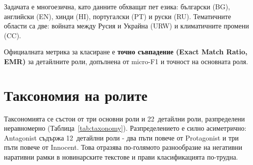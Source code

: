 \documentclass[12pt,a4paper]{report}
\begin{document}
Задачата е многоезична, като данните обхващат пет езика: български (BG), английски (EN), хинди (HI), португалски (PT) и руски (RU). Тематичните области са две: войната между Русия и Украйна (URW) и климатичните промени (CC).

Официалната метрика за класиране е \textbf{точно съвпадение (Exact Match Ratio, EMR)} за детайлните роли, допълнена от micro-F1 и точност на основната роля.


\section{Таксономия на ролите}

Таксономията се състои от три основни роли и 22~детайлни роли, разпределени неравномерно (Таблица~\ref{tab:taxonomy}). Разпределението е силно асиметрично: Antagonist съдържа 12~детайлни роли - два пъти повече от Protagonist и три пъти повече от Innocent. Това отразява по-голямото разнообразие на негативни наративни рамки в новинарските текстове и прави класификацията по-трудна.
\end{document}
